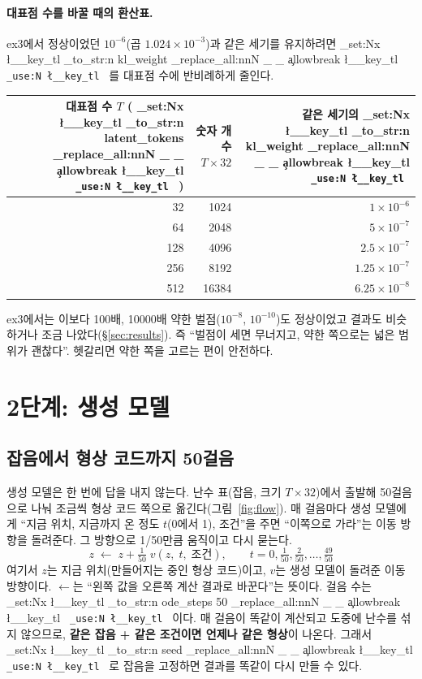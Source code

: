 \documentclass[11pt]{article}
\DeclareRobustCommand{\key}[1]{
  \tl_set:Nx \l__key_tl { \tl_to_str:n {#1} }
  \regex_replace_all:nnN { \_ } { \cO\_ \c{allowbreak} } \l__key_tl
  \texttt{ \tl_use:N \l__key_tl }
}
\begin{document}
\paragraph{대표점 수를 바꿀 때의 환산표.}
ex3에서 정상이었던 $10^{-6}$(곱 $1.024\times10^{-3}$)과 같은 세기를 유지하려면 \key{kl_weight}를 대표점 수에 반비례하게 줄인다.

\begin{center}\small
\begin{tabular}{r r r}
\toprule
대표점 수 $T$ (\key{latent_tokens}) & 숫자 개수 $T\times32$ & 같은 세기의 \key{kl_weight} \\
\midrule
32 & 1024 & $1\times10^{-6}$ \\
64 & 2048 & $5\times10^{-7}$ \\
128 & 4096 & $2.5\times10^{-7}$ \\
256 & 8192 & $1.25\times10^{-7}$ \\
512 & 16384 & $6.25\times10^{-8}$ \\
\bottomrule
\end{tabular}
\end{center}

ex3에서는 이보다 100배, 10000배 약한 벌점($10^{-8}$, $10^{-10}$)도 정상이었고 결과도 비슷하거나 조금 나았다(\S\ref{sec:results}).
즉 ``벌점이 세면 무너지고, 약한 쪽으로는 넓은 범위가 괜찮다''. 헷갈리면 약한 쪽을 고르는 편이 안전하다.

\section{2단계: 생성 모델}
\label{sec:fm}

\subsection{잡음에서 형상 코드까지 50걸음}

생성 모델은 한 번에 답을 내지 않는다. 난수 표(잡음, 크기 $T\times32$)에서 출발해 50걸음으로 나눠 조금씩 형상 코드 쪽으로
옮긴다(그림~\ref{fig:flow}). 매 걸음마다 생성 모델에게 ``지금 위치, 지금까지 온 정도 $t$(0에서 1), 조건''을 주면
``이쪽으로 가라''는 이동 방향을 돌려준다. 그 방향으로 1/50만큼 움직이고 다시 묻는다.
\[
z \;\leftarrow\; z + \tfrac{1}{50}\; v(z,\; t,\; \text{조건}), \qquad t = 0, \tfrac{1}{50}, \tfrac{2}{50}, \dots, \tfrac{49}{50}
\]
여기서 $z$는 지금 위치(만들어지는 중인 형상 코드)이고, $v$는 생성 모델이 돌려준 이동 방향이다. $\leftarrow$는 ``왼쪽 값을 오른쪽 계산 결과로 바꾼다''는 뜻이다.
걸음 수는 \key{ode_steps 50}이다. 매 걸음이 똑같이 계산되고 도중에 난수를 섞지 않으므로,
\textbf{같은 잡음 + 같은 조건이면 언제나 같은 형상}이 나온다. 그래서 \key{seed}로 잡음을 고정하면 결과를 똑같이 다시 만들 수 있다.
\end{document}
